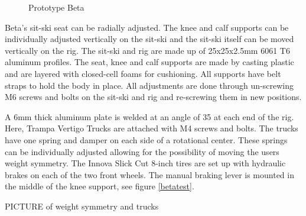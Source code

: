 \vspace{0.5cm}
\begin{figure}[htb!]
    \centering
    {\setlength{\fboxsep}{0pt}\setlength{\fboxrule}{1pt}
    }
    \captionsetup{justification=centering}
    \caption{Prototype Beta}
    \label{beta}
\end{figure}
\vspace{0.5cm}

Beta's sit-ski seat can be radially adjusted. The knee and calf supports can be individually adjusted vertically on the sit-ski and the sit-ski itself can be moved vertically on the rig. The sit-ski and rig are made up of 25x25x2.5mm 6061 T6 aluminum profiles. The seat, knee and calf supports are made by casting plastic and are layered with closed-cell foams for cushioning. All supports have belt straps to hold the body in place. All adjustments are done through un-screwing M6 screws and bolts on the sit-ski and rig and re-screwing them in new positions.
\par
A 6mm thick aluminum plate is welded at an angle of 35{\degree} at each end of the rig. Here, Trampa Vertigo Trucks are attached with M4 screws and bolts. The trucks have one spring and damper on each side of a rotational center. These springs can be individually adjusted allowing for the possibility of moving the users weight symmetry. The Innova Slick Cut 8-inch tires are set up with hydraulic brakes on each of the two front wheels. The manual braking lever is mounted in the middle of the knee support, see figure \ref{betatest}.

PICTURE of weight symmetry and trucks

